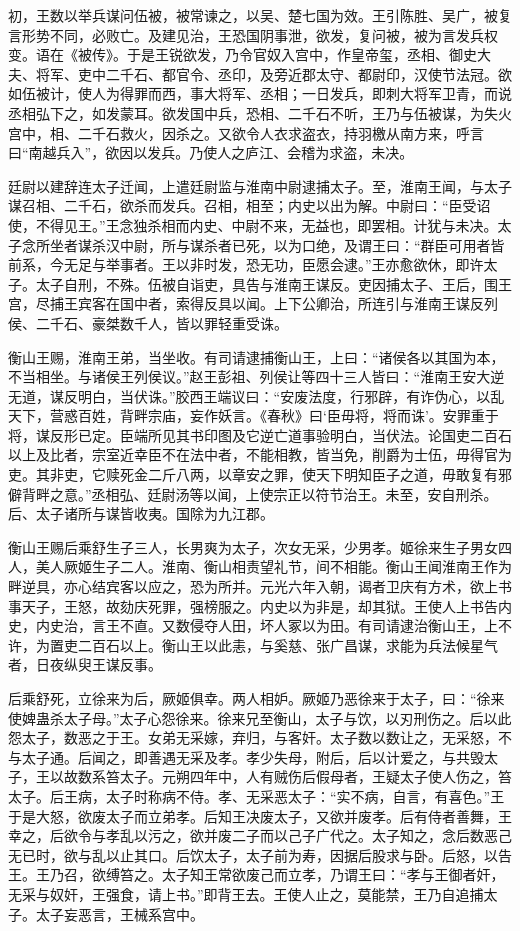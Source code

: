 \documentclass[12pt,UTF8]{ctexbook}
\begin{document}
初，王数以举兵谋问伍被，被常谏之，以吴、楚七国为效。王引陈胜、吴广，被复言形势不同，必败亡。及建见治，王恐国阴事泄，欲发，复问被，被为言发兵权变。语在《被传》。于是王锐欲发，乃令官奴入宫中，作皇帝玺，丞相、御史大夫、将军、吏中二千石、都官令、丞印，及旁近郡太守、都尉印，汉使节法冠。欲如伍被计，使人为得罪而西，事大将军、丞相；一日发兵，即刺大将军卫青，而说丞相弘下之，如发蒙耳。欲发国中兵，恐相、二千石不听，王乃与伍被谋，为失火宫中，相、二千石救火，因杀之。又欲令人衣求盗衣，持羽檄从南方来，呼言曰“南越兵入”，欲因以发兵。乃使人之庐江、会稽为求盗，未决。



廷尉以建辞连太子迁闻，上遣廷尉监与淮南中尉逮捕太子。至，淮南王闻，与太子谋召相、二千石，欲杀而发兵。召相，相至；内史以出为解。中尉曰：“臣受诏使，不得见王。”王念独杀相而内史、中尉不来，无益也，即罢相。计犹与未决。太子念所坐者谋杀汉中尉，所与谋杀者已死，以为口绝，及谓王曰：“群臣可用者皆前系，今无足与举事者。王以非时发，恐无功，臣愿会逮。”王亦愈欲休，即许太子。太子自刑，不殊。伍被自诣吏，具告与淮南王谋反。吏因捕太子、王后，围王宫，尽捕王宾客在国中者，索得反具以闻。上下公卿治，所连引与淮南王谋反列侯、二千石、豪桀数千人，皆以罪轻重受诛。



衡山王赐，淮南王弟，当坐收。有司请逮捕衡山王，上曰：“诸侯各以其国为本，不当相坐。与诸侯王列侯议。”赵王彭祖、列侯让等四十三人皆曰：“淮南王安大逆无道，谋反明白，当伏诛。”胶西王端议曰：“安废法度，行邪辟，有诈伪心，以乱天下，营惑百姓，背畔宗庙，妄作妖言。《春秋》曰‘臣毋将，将而诛’。安罪重于将，谋反形已定。臣端所见其书印图及它逆亡道事验明白，当伏法。论国吏二百石以上及比者，宗室近幸臣不在法中者，不能相教，皆当免，削爵为士伍，毋得官为吏。其非吏，它赎死金二斤八两，以章安之罪，使天下明知臣子之道，毋敢复有邪僻背畔之意。”丞相弘、廷尉汤等以闻，上使宗正以符节治王。未至，安自刑杀。后、太子诸所与谋皆收夷。国除为九江郡。



衡山王赐后乘舒生子三人，长男爽为太子，次女无采，少男孝。姬徐来生子男女四人，美人厥姬生子二人。淮南、衡山相责望礼节，间不相能。衡山王闻淮南王作为畔逆具，亦心结宾客以应之，恐为所并。元光六年入朝，谒者卫庆有方术，欲上书事天子，王怒，故劾庆死罪，强榜服之。内史以为非是，却其狱。王使人上书告内史，内史治，言王不直。又数侵夺人田，坏人冢以为田。有司请逮治衡山王，上不许，为置吏二百石以上。衡山王以此恚，与奚慈、张广昌谋，求能为兵法候星气者，日夜纵臾王谋反事。



后乘舒死，立徐来为后，厥姬俱幸。两人相妒。厥姬乃恶徐来于太子，曰：“徐来使婢蛊杀太子母。”太子心怨徐来。徐来兄至衡山，太子与饮，以刃刑伤之。后以此怨太子，数恶之于王。女弟无采嫁，弃归，与客奸。太子数以数让之，无采怒，不与太子通。后闻之，即善遇无采及孝。孝少失母，附后，后以计爱之，与共毁太子，王以故数系笞太子。元朔四年中，人有贼伤后假母者，王疑太子使人伤之，笞太子。后王病，太子时称病不侍。孝、无采恶太子：“实不病，自言，有喜色。”王于是大怒，欲废太子而立弟孝。后知王决废太子，又欲并废孝。后有侍者善舞，王幸之，后欲令与孝乱以污之，欲并废二子而以己子广代之。太子知之，念后数恶己无已时，欲与乱以止其口。后饮太子，太子前为寿，因据后股求与卧。后怒，以告王。王乃召，欲缚笞之。太子知王常欲废己而立孝，乃谓王曰：“孝与王御者奸，无采与奴奸，王强食，请上书。”即背王去。王使人止之，莫能禁，王乃自追捕太子。太子妄恶言，王械系宫中。
\end{document}
